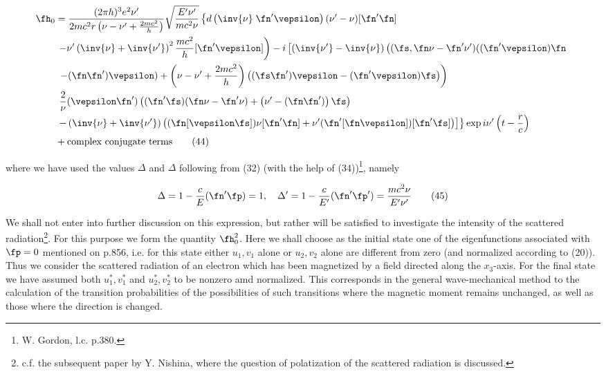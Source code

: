 \documentclass{article}
\newcommand{\nequ}[2]{
\begin{align*}
#1
\tag{#2}
\end{align*}
}
\begin{document}
\nequ{
\fh_0 &= \frac{(2\pi h)^3 e^2 \nu'}{2mc^2 r\left(\nu-\nu' + \frac{2mc^2}{h}\right)}
\sqrt{\frac{E'\nu'}{mc^2\nu}}\left\{d\left(\inv{\nu}\left.\fn'\vepsilon\right)(\nu' - \nu)[\fn'\fn]\right.\right.\\
&\left.\left. - \nu'\left(\inv{\nu} + \inv{\nu'}\right)^2\frac{mc^2}{h}[\fn'\vepsilon]\right)
- i\left[\left(\inv{\nu'} - \inv{\nu}\right)\left((\fs,\fn\nu - \fn'\nu')((\fn'\vepsilon)\fn
\right.\right.\right.\\
&\left.\left.\left. - (\fn\fn')\vepsilon) + \left(\nu-\nu'+\frac{2mc^2}{h}\right)
\left((\fs\fn')\vepsilon - (\fn'\vepsilon)\fs\right)\right)\right.\right.\\
&\left.\left.\frac{2}{\nu}(\vepsilon\fn')\left((\fn'\fs)(\fn\nu - \fn'\nu)
+ \left(\nu' - (\fn\fn')\right)\fs\right)\right.\right.\\
&\left.\left. - \left(\inv{\nu} + \inv{\nu'}\right)\left((\fn[\vepsilon\fs])\nu[\fn'\fn]
+ \nu'(\fn'[\fn\vepsilon])[\fn'\fs]\right)\right]\right\}
\exp{i\nu'\left(t-\frac{r}{c}\right)}\\
& + \text{complex conjugate terms}
}{44}
where we have used the values $\Delta$ and $\Delta$ following from (32) (with the help of (34))\footnote{W. Gordon, l.c. p.380.}, namely
\nequ{
\Delta =  1 - \frac{c}{E}(\fn'\fp) = 1, \quad
\Delta' = 1 - \frac{c}{E'}(\fn'\fp') = \frac{mc^2\nu}{E'\nu'}
}{45}

We shall not enter into further discussion on this expression, but rather will be satisfied to investigate the intensity of the scattered radiation\footnote{c.f. the subsequent paper by Y. Nishina, where the question of polatization of the scattered radiation is discussed.}. For this purpose we form the quantity $\fh_0^2$. Here we shall choose as the initial state one of the eigenfunctions associated with $\fp=0$ mentioned on p.856, i.e. for this state either $u_1,v_1$ alone or $u_2,v_2$ alone are different from zero (and normalized according to (20)). Thus we consider the scattered radiation of an electron which has been magnetized by a field directed along the $x_3$-axis. For the final state we have assumed both $u_1^*, v_1^*$ and $u_2^*, v_2^*$ to be nonzero amd normalized. This corresponds in the general wave-mechanical method to the calculation of the transition probabilities of the possibilities of such transitions where the magnetic moment remains unchanged, as well as those where the direction is changed.
\end{document}
